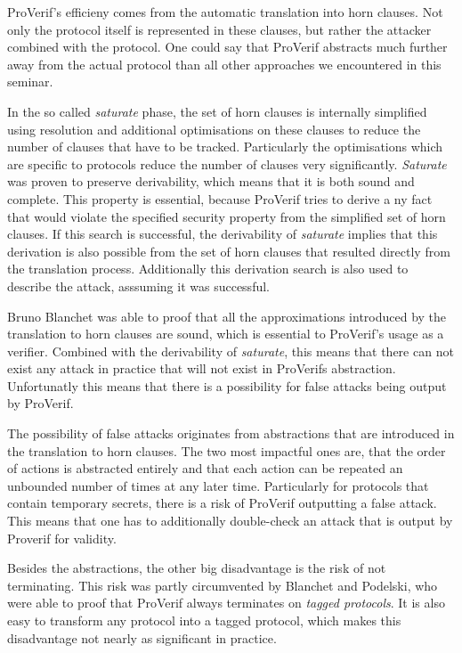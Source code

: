 \documentclass[a4paper,UKenglish]{lipics-v2018}
\begin{document}
ProVerif's efficieny comes from the automatic translation into horn clauses. Not only the protocol itself is represented in these clauses, but rather the attacker combined with the protocol. One could say that ProVerif abstracts much further away from the actual protocol than all other approaches we encountered in this seminar.\cite{ProVerif}

In the so called \textit{saturate} phase, the set of horn clauses is internally simplified using resolution and additional optimisations on these clauses to reduce the number of clauses that have to be tracked. Particularly the optimisations which are specific to protocols reduce the number of clauses very significantly. \textit{Saturate} was proven to preserve derivability, which means that it is both sound and complete. This property is essential, because ProVerif tries to derive a ny fact that would violate the specified security property from the simplified set of horn clauses. If this search is successful, the derivability of \textit{saturate} implies that this derivation is also possible from the set of horn clauses that resulted directly from the translation process. Additionally this derivation search is also used to describe the attack, asssuming it was successful.\cite{ProVerif}

Bruno Blanchet was able to proof that all the approximations introduced by the translation to horn clauses are sound, which is essential to ProVerif's usage as a verifier. Combined with the derivability of \textit{saturate}, this means that there can not exist any attack in practice that will not exist in ProVerifs abstraction. Unfortunatly this means that there is a possibility for false attacks being output by ProVerif.\cite{ProVerif}

The possibility of false attacks originates from abstractions that are introduced in the translation to horn clauses. The two most impactful ones are, that the order of actions is abstracted entirely and that each action can be repeated an unbounded number of times at any later time. Particularly for protocols that contain temporary secrets, there is a risk of ProVerif outputting a false attack.
This means that one has to additionally double-check an attack that is output by Proverif for validity. \cite{ProVerif}

Besides the abstractions, the other big disadvantage is the risk of not terminating. This risk was partly circumvented by Blanchet and Podelski, who were able to proof that ProVerif always terminates on \textit{tagged protocols}.\cite{tagging} It is also easy to transform any protocol into a tagged protocol, which makes this disadvantage not nearly as significant in practice.\cite{ProVerif}
\end{document}
